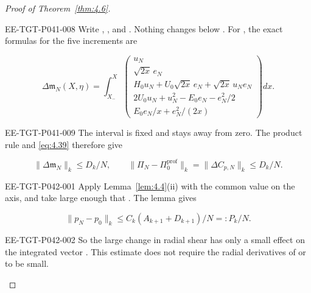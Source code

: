 \begin{proof}[Proof of Theorem~\ref{thm:4.6}]
\begin{EESegment}{EE-TGT-P041-008}
Write ,
, and
. Nothing changes below
. For , the exact formulas for the five increments are
\end{EESegment}
\[
\Delta\mathfrak m_N(X,\eta)=\int_{X_-}^{X}
\begin{pmatrix}
u_N\\
\sqrt{2x}\,e_N\\
H_0u_N+U_0\sqrt{2x}\,e_N+\sqrt{2x}\,u_Ne_N\\
2U_0u_N+u_N^2-E_0e_N-e_N^2/2\\
E_0e_N/x+e_N^2/(2x)
\end{pmatrix}dx.
\]
\begin{EESegment}{EE-TGT-P041-009}
The interval is fixed and stays away from zero. The product rule and \eqref{eq:4.39} therefore give
\end{EESegment}
\[
\lVert\Delta\mathfrak m_N\rVert_k\le D_k/N,
\qquad
\lVert\Pi_N-\Pi_0^{\mathrm{prof}}\rVert_k
=\lVert\Delta C_{p,N}\rVert_k\le D_k/N.
\]
\begin{EESegment}{EE-TGT-P042-001}
Apply Lemma~\ref{lem:4.4}(ii) with the common value
 on the axis, and take  large enough that
. The lemma gives
\end{EESegment}
\begin{equation}
\lVert p_N-p_0\rVert_k\le C_k(A_{k+1}+D_{k+1})/N=:P_k/N.
\tag{4.40}\label{eq:4.40}
\end{equation}
\begin{EESegment}{EE-TGT-P042-002}
So the large change in radial shear has only a small effect on the integrated vector
. This estimate does not require the radial derivatives of
 or  to be small.
\end{EESegment}


\end{proof}
